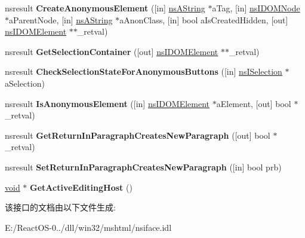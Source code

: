 \begin{DoxyCompactItemize}
\item 
\mbox{\label{interfacens_i_h_t_m_l_editor_ab039f753fb9d61bdcb3b9d0ae484bdc4}} 
nsresult {\bfseries Create\+Anonymous\+Element} (\mbox{[}in\mbox{]} \hyperlink{structns_string_container}{ns\+A\+String} $\ast$a\+Tag, \mbox{[}in\mbox{]} \hyperlink{interfacens_i_d_o_m_node}{ns\+I\+D\+O\+M\+Node} $\ast$a\+Parent\+Node, \mbox{[}in\mbox{]} \hyperlink{structns_string_container}{ns\+A\+String} $\ast$a\+Anon\+Class, \mbox{[}in\mbox{]} bool a\+Is\+Created\+Hidden, \mbox{[}out\mbox{]} \hyperlink{interfacens_i_d_o_m_element}{ns\+I\+D\+O\+M\+Element} $\ast$$\ast$\+\_\+retval)
\item 
\mbox{\label{interfacens_i_h_t_m_l_editor_a8a18672fb340e0d25b70abc8cf472040}} 
nsresult {\bfseries Get\+Selection\+Container} (\mbox{[}out\mbox{]} \hyperlink{interfacens_i_d_o_m_element}{ns\+I\+D\+O\+M\+Element} $\ast$$\ast$\+\_\+retval)
\item 
\mbox{\label{interfacens_i_h_t_m_l_editor_af40840858a6b70b092c3d1f0402ac0b1}} 
nsresult {\bfseries Check\+Selection\+State\+For\+Anonymous\+Buttons} (\mbox{[}in\mbox{]} \hyperlink{interfacens_i_selection}{ns\+I\+Selection} $\ast$a\+Selection)
\item 
\mbox{\label{interfacens_i_h_t_m_l_editor_aecca5bf6795cc76dadd1a83392575537}} 
nsresult {\bfseries Is\+Anonymous\+Element} (\mbox{[}in\mbox{]} \hyperlink{interfacens_i_d_o_m_element}{ns\+I\+D\+O\+M\+Element} $\ast$a\+Element, \mbox{[}out\mbox{]} bool $\ast$\+\_\+retval)
\item 
\mbox{\label{interfacens_i_h_t_m_l_editor_aa3d1486bd84bbb380566baf78b0edce7}} 
nsresult {\bfseries Get\+Return\+In\+Paragraph\+Creates\+New\+Paragraph} (\mbox{[}out\mbox{]} bool $\ast$\+\_\+retval)
\item 
\mbox{\label{interfacens_i_h_t_m_l_editor_ad01fd2f4c92e7ebe7999b2481b0eb9a9}} 
nsresult {\bfseries Set\+Return\+In\+Paragraph\+Creates\+New\+Paragraph} (\mbox{[}in\mbox{]} bool prb)
\item 
\mbox{\label{interfacens_i_h_t_m_l_editor_aa1074166e84bdb5054f8616d6aefd754}} 
\hyperlink{interfacevoid}{void} $\ast$ {\bfseries Get\+Active\+Editing\+Host} ()
\end{DoxyCompactItemize}


该接口的文档由以下文件生成\+:\begin{DoxyCompactItemize}
\item 
E\+:/\+React\+O\+S-\/0../dll/win32/mshtml/nsiface.\+idl\end{DoxyCompactItemize}
